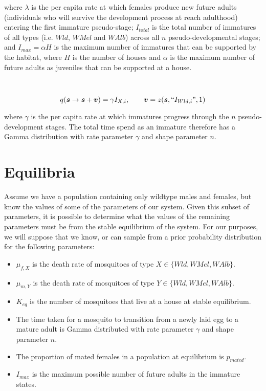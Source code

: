 \documentclass[]{article}  %
\begin{document}
\noindent where $\lambda$ is the per capita rate at which females produce new future adults (individuals who will survive the development process at reach adulthood) entering the first immature pseudo-stage; $I_{total}$ is the total number of immatures of all types (i.e. $Wld$, $WMel$ and $WAlb$) across all $n$ pseudo-developmental stages; and $I_{max} = \alpha H$ is the maximum number of immatures that can be supported by the habitat, where $H$ is the number of houses and $\alpha$ is the maximum number of future adults as juveniles that can be supported at a house.
\\
\\
\\
$$q(\boldsymbol{s} \rightarrow \boldsymbol{s} + \boldsymbol{v}) = \gamma I_{X, i},  \qquad \boldsymbol{v} =  z(\boldsymbol{s}, \textup{``} I_{Wld, i} \textup{''} , 1)$$

\noindent where $\gamma$ is the per capita rate at which immatures progress through the $n$ pseudo-development stages.  The total time spend as an immature therefore has a Gamma distribution with rate parameter $\gamma$ and shape parameter $n$.

\section{Equilibria}
Assume we have a population containing only wildtype males and females, but know the values of some of the parameters of our system.  Given this subset of parameters, it is possible to determine what the values of the remaining parameters must be from the stable equilibrium of the system.  For our purposes, we will suppose that we know, or can sample from a prior probability distribution for the following parameters:

\begin{itemize}
\item $\mu_{f, X}$ is the death rate of mosquitoes of type $X \in \{ Wld, WMel, WAlb \}$.
\item $\mu_{m, Y}$ is the death rate of mosquitoes of type $Y \in \{ Wld, WMel, WAlb \}$.
\item $K_{eq}$ is the number of mosquitoes that live at a house at stable equilibrium.
\item The time taken for a mosquito to transition from a newly laid egg to a mature adult is Gamma distributed with rate parameter $\gamma$ and shape parameter $n$.
\item The proportion of mated females in a population at equilibrium is $p_{mated}$.
\item $I_{max}$ is the maximum possible number of future adults in the immature states.
\end{itemize}
\end{document}
